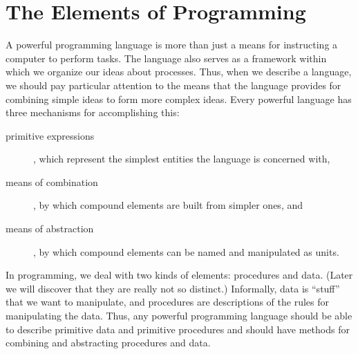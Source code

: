 \section{The Elements of Programming}
\label{Section 1.1}

A powerful programming language is more than just a means for instructing a
computer to perform tasks.
The language also serves as a framework within which we organize our ideas about processes.
Thus, when we describe a language, we should pay particular attention to the means that the language provides for combining simple ideas to form more complex ideas.
Every powerful language has three mechanisms for accomplishing this:
\begin{description}

	\item[primitive expressions],
	which represent the simplest entities the language is concerned with,

	\item[means of combination],
	by which compound elements are built from simpler ones, and

	\item[means of abstraction],
	by which compound elements can be named and manipulated as units.

\end{description}

In programming, we deal with two kinds of elements:
procedures and data.
(Later we will discover that they are really not so distinct.)
Informally, data is “stuff” that we want to manipulate, and procedures are descriptions of the rules for manipulating the data.
Thus, any powerful programming language should be able to describe primitive data and primitive procedures and should have methods for combining and abstracting procedures and data.


